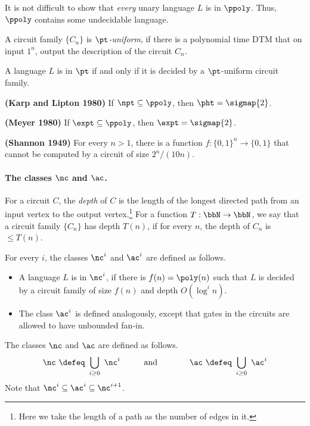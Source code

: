 \documentclass[11pt, a4paper]{article}
\begin{document}
\begin{remark}
It is not difficult to show that {\em every} unary language $L$ is in $\ppoly$.
Thus, $\ppoly$ contains some undecidable language.
\end{remark}

\begin{definition}
\label{def:p-uniform}
A circuit family $\{C_n\}$ is {\em $\pt$-uniform}, if there is a polynomial time DTM
that on input $1^n$, output the description of the circuit $C_n$. 
\end{definition}


\begin{theorem}
\label{theo:pt-p-uniform}
A language $L$ is in $\pt$ if and only if
it is decided by a $\pt$-uniform circuit family.
\end{theorem}

\begin{theorem}
\label{theo:karp-lipton-circuit}
{\bf (Karp and Lipton 1980)}
If $\npt \subseteq \ppoly$, then $\pht=\sigmap{2}$. 
\end{theorem}

\begin{theorem}
{\bf (Meyer 1980)}
If $\expt \subseteq \ppoly$, then $\expt=\sigmap{2}$. 
\end{theorem}

\begin{theorem}
{\bf (Shannon 1949)}
For every $n>1$, there is a function $f:\{0,1\}^n\to \{0,1\}$ that
cannot be computed by a circuit of size $2^n/(10n)$.
\end{theorem}


\paragraph*{The classes $\nc$ and $\ac$.}
For a circuit $C$, the {\em depth} of $C$ is the length of the longest directed path
from an input vertex to the output vertex.\footnote{Here we take the length of a path as the number of edges in it.}
For a function $T:\bbN\to\bbN$, we say that a circuit family $\{C_n\}$ has depth $T(n)$,
if for every $n$, the depth of $C_n$ is $\leq T(n)$.

For every $i$, the classes $\nc^i$ and $\ac^i$ are defined as follows.
\begin{itemize}
\item 
A language $L$ is in $\nc^i$, if there is $f(n)=\poly(n)$ such that 
$L$ is decided by a circuit family of size $f(n)$ and depth $O(\log^i n)$.
\item 
The class $\ac^i$ is defined analogously, except that gates in the circuits are allowed to have unbounded fan-in.
\end{itemize}
The classes $\nc$ and $\ac$ are defined as follows.
\begin{eqnarray*}
\nc \ \defeq \ \bigcup_{i\geq 0}\ \nc^i
&\hspace{1cm}\text{and}\hspace{1cm} &
\ac \ \defeq \ \bigcup_{i\geq 0}\ \ac^i
\end{eqnarray*}
Note that $\nc^i \subseteq \ac^i \subseteq \nc^{i+1}$.
\end{document}

